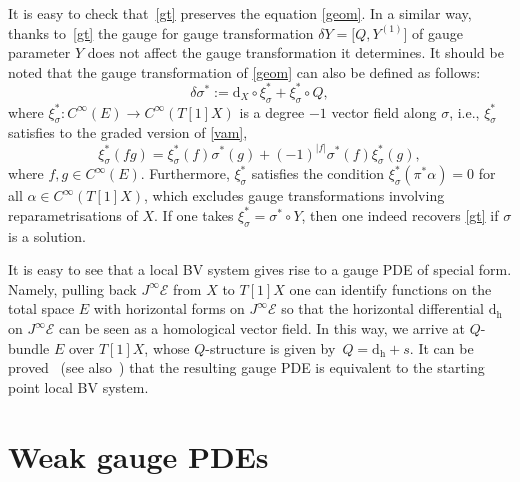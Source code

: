 \documentclass[pdftex]{sigma}
\numberwithin{equation}{section}
\theoremstyle{definition}
\newcommand{\dx}{\mathrm{d}_X}
\renewcommand{\dh}{\mathrm{d_h}}
\def\cE{\mathcal{E}}
\begin{document}
It is easy to check that~\eqref{gt} preserves the equation \eqref{geom}. In a similar way, thanks to~\eqref{gt}
the gauge for gauge transformation $\delta Y=\bigl[Q,Y^{(1)}\bigr]$ of gauge parameter $Y$ does not affect the gauge transformation it determines. It should be noted that the gauge transformation of \eqref{geom} can also be defined as follows:
\begin{equation*}
 \delta\sigma^*:=\dx\circ\xi^*_{\sigma}+\xi^*_{\sigma}\circ Q,
\end{equation*}
where $\xi^*_{\sigma}\colon C^{\infty}(E)\rightarrow C^{\infty}(T[1]X)$ is a degree $-1$ vector field along $\sigma$, i.e., $\xi^*_{\sigma}$ satisfies to the graded version of \eqref{vam},
\begin{equation*}
 \xi^*_{\sigma}(fg)=\xi^*_{\sigma}(f)\sigma^*(g)+(-1)^{|f|}\sigma^*(f)\xi^*_{\sigma}(g),
\end{equation*}
where $f,g\in C^{\infty}(E)$. Furthermore, $\xi^*_{\sigma}$ satisfies the condition $ \xi^*_{\sigma}(\pi^*\alpha)=0$ for all $\alpha\in C^{\infty}(T[1]X) $, which excludes gauge transformations involving reparametrisations of $X$. If one takes $\xi^*_{\sigma}=\sigma^*\circ Y$, then one indeed recovers \eqref{gt} if $\sigma$ is a solution.

It is easy to see that a local BV system gives rise to a gauge PDE of special form. Namely, pulling back $J^\infty\cE$ from $X$ to $T[1]X$ one can identify functions on the total space $E$ with horizontal forms on $J^\infty\cE$ so that the horizontal differential $\dh$ on $J^\infty\cE$ can be seen as a homological vector field. In this way, we arrive at $Q$-bundle $E$ over $T[1]X$, whose $Q$-structure is given by~${Q=\dh+s}$. It can be proved~\cite{Barnich:2010sw} (see also~\cite{Barnich:2004cr,Grigoriev:2019ojp}) that the resulting gauge PDE is equivalent to the starting point local BV system.

\section{Weak gauge PDEs}\label{sec:wgpde}
\end{document}
